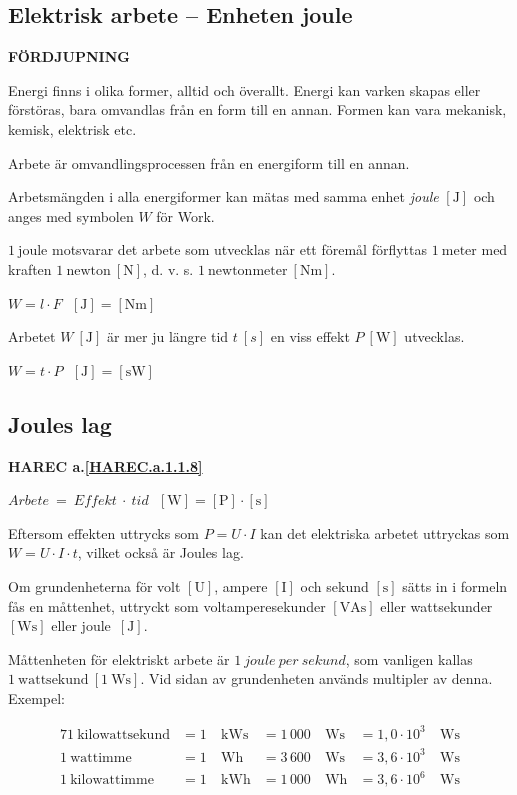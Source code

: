 \subsection{Elektrisk arbete -- Enheten joule}
\textbf{FÖRDJUPNING}

Energi finns i olika former, alltid och överallt.
Energi kan varken skapas eller förstöras, bara omvandlas från en form till en
annan.
Formen kan vara mekanisk, kemisk, elektrisk etc.

Arbete är omvandlingsprocessen från en energiform till en annan.

Arbetsmängden i alla energiformer kan mätas med samma enhet \emph{joule}
\(\mathrm{[J]}\) \cite{SIbrochure8} och anges med symbolen \(W\) för Work.

\(1\ \mathrm{joule}\) motsvarar det arbete som utvecklas när ett föremål
förflyttas \(1\ \mathrm{meter}\) med kraften \(1\ \mathrm{newton\ [N]}\),
d. v. s. \(1\ \mathrm{newtonmeter\ [Nm]}\).

\(W = l \cdot F \ \ \ \mathrm{[J] = [Nm]}\)

Arbetet \(W\ \mathrm{[J]}\) är mer ju längre tid \(t\ [s]\) en viss effekt
\(P\ \mathrm{[W]}\) utvecklas.

\(W = t \cdot P \ \ \ \mathrm{[J] = [sW]}\)
  
\subsection{Joules lag}
\textbf{HAREC a.\ref{HAREC.a.1.1.8}\label{myHAREC.a.1.1.8}}

\(Arbete\ =\ Effekt\ \cdot\ tid\ \ \ \mathrm{[W]} = \mathrm{[P]} \cdot \mathrm{[s]}\)

Eftersom effekten uttrycks som \(P = U \cdot I\) kan det elektriska arbetet
uttryckas som \(W = U \cdot I \cdot t\), vilket också är Joules lag.

Om grundenheterna för volt \(\mathrm{[U]}\), ampere \(\mathrm{[I]}\) och
sekund \(\mathrm{[s]}\) sätts in i formeln fås en måttenhet, uttryckt som
voltamperesekunder \(\mathrm{[VAs]}\) eller wattsekunder \(\mathrm{[Ws]}\)
eller joule\ \(\mathrm{[J]}\).

Måttenheten för elektriskt arbete är \(1\ joule\ per\ sekund\), som vanligen
kallas \(1\ \mathrm{wattsekund}\ \mathrm{[1\ Ws]}\).
Vid sidan av grundenheten används multipler av denna.
Exempel:

\begin{alignat*}{7}
1\ \mathrm{kilowattsekund} & = 1\ &\mathrm{kWs} & = 1\,000\ &\mathrm{Ws} & = 1,0 \cdot 10^3\ &\mathrm{Ws} \\
1\ \mathrm{wattimme}       & = 1\ &\mathrm{Wh}  & = 3\,600\ &\mathrm{Ws} & = 3,6 \cdot 10^3\ &\mathrm{Ws} \\
1\ \mathrm{kilowattimme}   & = 1\ &\mathrm{kWh} & = 1\,000\ &\mathrm{Wh} & = 3,6 \cdot 10^6\ &\mathrm{Ws} \\
\end{alignat*}

